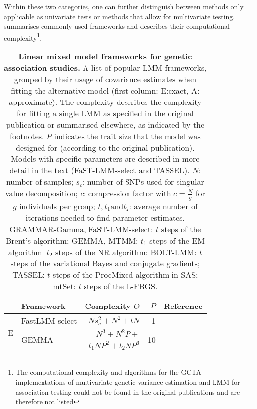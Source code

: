 Within these two categories, one can further distinguish between methods only applicable as univariate tests or methods that allow for multivariate testing.  summarises commonly used frameworks and describes their computational complexity\footnote{The computational complexity and algorithms for the GCTA implementations \citep{Yang2011} of multivariate genetic variance estimation \citep{Lee2012} and LMM for association testing \citep{Yang2014} could not be found in the original publications and are therefore not listed}.
\\
\begin{table}[h]
  \centering
  \caption[\textbf{Linear mixed model frameworks for genetic association studies.}]{\textbf{Linear mixed model frameworks for genetic association studies.} A list of popular LMM frameworks, grouped by their usage of covariance estimates when fitting the alternative model (first column: E:exact, A: approximate). The complexity describes the complexity for fitting a single LMM as specified in the original publication or summarised elsewhere, as indicated by the footnotes. \(P\) indicates the trait size that the model was designed for (according to the original publication). Models with specific parameters are described in more detail in the text (FaST-LMM-select and TASSEL). \(N\): number of samples;  \(s_c\): number of SNPs used for singular value decomposition; \(c\):  compression factor with \(c=\frac{N}{g}\) for \(g\) individuals per group; \(t, t_1 \text{and} t_2\): average number of iterations needed to find parameter estimates. GRAMMAR-Gamma, FaST-LMM-select: \(t\) steps of the Brent's algorithm;  GEMMA, MTMM: \(t_1\) steps of the EM algorithm, \(t_2\) steps of the NR algorithm; BOLT-LMM: \(t\) steps of the variational Bayes and conjugate gradients; TASSEL: \(t\) steps of the ProcMixed algorithm in SAS; mtSet: \(t\) steps of the L-FBGS.}
  \begin{small}
     \begin{tabular}{llrrr}
    \toprule
     & Framework & Complexity \(O\) & \(P\) & Reference \\
    \midrule
    \multirow{3}[1]{*}{E} & FastLMM-select & \(Ns_c^2 + N^2 + tN\) & \num{1} & \citep{Lippert2011} \\
          & \multicolumn{1}{l}{\multirow{2}[0]{*}{GEMMA}} & \(N^3 + N^2P  + \)&  \multirow{2}[0]{*}{\num{10}} & \citep{Zhou2014} \\
          \addlinespace[-.2ex]
          & & \( t_1NP^2 + t_2NP^6\) & &\citep{Zhou2014} \\

\end{tabular}
\end{small}
\end{table}
